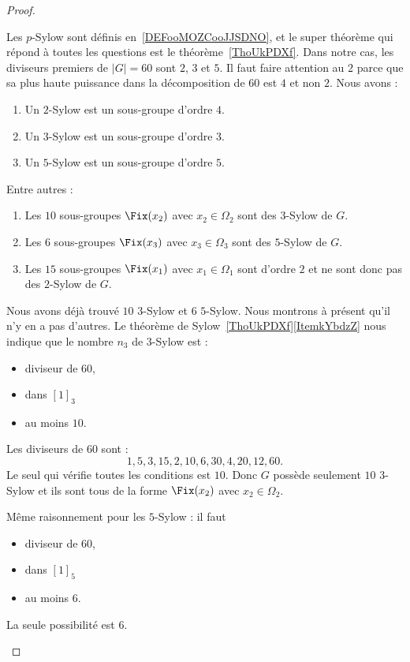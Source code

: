 \begin{proof}
\begin{subproof}
		Les \( p\)-Sylow sont définis en~\ref{DEFooMOZCooJJSDNO}, et le super théorème qui répond à toutes les questions est le théorème~\ref{ThoUkPDXf}. Dans notre cas, les diviseurs premiers de \( | G |=60\) sont \( 2\), \( 3\) et \( 5\). Il faut faire attention au \( 2\) parce que sa plus haute puissance dans la décomposition de \( 60\) est \( 4\) et non \( 2\). Nous avons :
		\begin{enumerate}
			\item
			      Un \( 2\)-Sylow est un sous-groupe d'ordre \( 4\).
			\item
			      Un \( 3\)-Sylow est un sous-groupe d'ordre \( 3\).
			\item
			      Un \( 5\)-Sylow est un sous-groupe d'ordre \( 5\).
		\end{enumerate}
		Entre autres :
		\begin{enumerate}
			\item
			      Les \( 10\) sous-groupes \( \Fix(x_2)\) avec \( x_2\in \Omega_2\) sont des \( 3\)-Sylow de \( G\).
			\item
			      Les \( 6\) sous-groupes \( \Fix(x_3)\) avec \( x_3\in \Omega_3\) sont des \( 5\)-Sylow de \( G\).
			\item
			      Les \( 15\) sous-groupes \( \Fix(x_1)\) avec \( x_1\in \Omega_1\) sont d'ordre \( 2\) et ne sont donc pas des \( 2\)-Sylow de \( G\).
		\end{enumerate}

		Nous avons déjà trouvé \( 10\) \( 3\)-Sylow et \( 6\) \( 5\)-Sylow. Nous montrons à présent qu'il n'y en a pas d'autres. Le théorème de Sylow~\ref{ThoUkPDXf}\ref{ItemkYbdzZ} nous indique que le nombre \( n_3\) de \( 3\)-Sylow est :
		\begin{itemize}
			\item diviseur de \( 60\),
			\item dans \( [1]_3\)
			\item au moins \( 10\).
		\end{itemize}
		Les diviseurs de \( 60\) sont :
		\begin{equation}
			1,5,3,15,2,10,6,30,4,20,12,60.
		\end{equation}
		Le seul qui vérifie toutes les conditions est \( 10\). Donc \( G\) possède seulement \( 10\) \( 3\)-Sylow et ils sont tous de la forme \( \Fix(x_2)\) avec \( x_2\in \Omega_2\).

		Même raisonnement pour les \( 5\)-Sylow : il faut
		\begin{itemize}
			\item diviseur de \( 60\),
			\item dans \( [1]_5\)
			\item au moins \( 6\).
		\end{itemize}
		La seule possibilité est \( 6\).


\end{subproof}
\end{proof}
